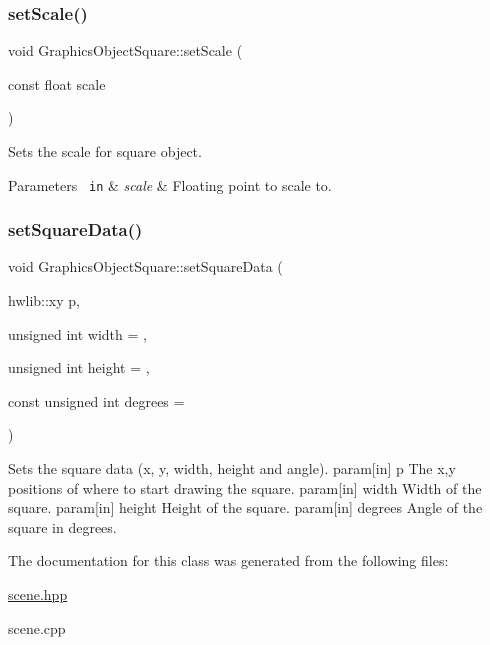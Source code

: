 \subsubsection{\texorpdfstring{setScale()}{setScale()}}
{\footnotesize\ttfamily void Graphics\+Object\+Square\+::set\+Scale (\begin{DoxyParamCaption}\item[{const float}]{scale }\end{DoxyParamCaption})}



Sets the scale for square object. 


\begin{DoxyParams}[1]{Parameters}
\mbox{\texttt{ in}}  & {\em scale} & Floating point to scale to. \\
\hline
\end{DoxyParams}
\mbox{\label{class_graphics_object_square_abc8b9bacc687ce180f6a03ea6c8ee69b}} 
\subsubsection{\texorpdfstring{setSquareData()}{setSquareData()}}
{\footnotesize\ttfamily void Graphics\+Object\+Square\+::set\+Square\+Data (\begin{DoxyParamCaption}\item[{hwlib\+::xy}]{p,  }\item[{unsigned int}]{width = {},  }\item[{unsigned int}]{height = {},  }\item[{const unsigned int}]{degrees = {} }\end{DoxyParamCaption})}

Sets the square data (x, y, width, height and angle). param\mbox{[}in\mbox{]} p The x,y positions of where to start drawing the square. param\mbox{[}in\mbox{]} width Width of the square. param\mbox{[}in\mbox{]} height Height of the square. param\mbox{[}in\mbox{]} degrees Angle of the square in degrees. 

The documentation for this class was generated from the following files\+:\begin{DoxyCompactItemize}
\item 
\mbox{\hyperlink{scene_8hpp}{scene.\+hpp}}\item 
scene.\+cpp\end{DoxyCompactItemize}
